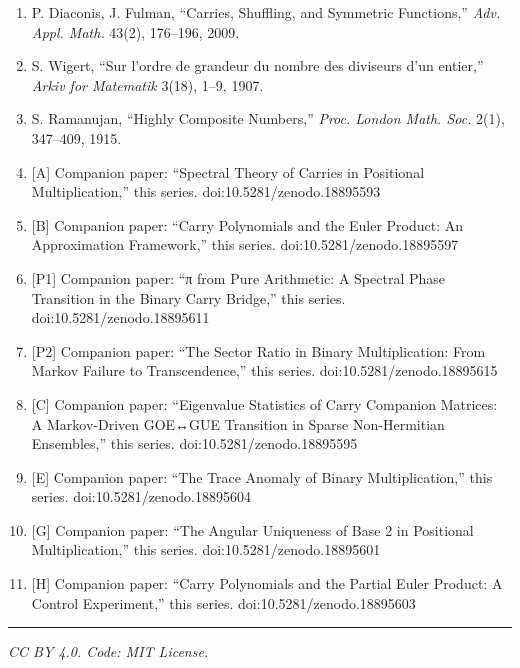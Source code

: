 \documentclass[
  11pt,
]{article}
\providecommand{\tightlist}{%
  \setlength{\itemsep}{0pt}\setlength{\parskip}{0pt}}
\begin{document}
\begin{enumerate}
\def\labelenumi{\arabic{enumi}.}
\tightlist
\item
  P. Diaconis, J. Fulman, ``Carries, Shuffling, and Symmetric Functions,''
  \emph{Adv. Appl. Math.} 43(2), 176--196, 2009.
\item
  S. Wigert, ``Sur l'ordre de grandeur du nombre des diviseurs d'un entier,''
  \emph{Arkiv for Matematik} 3(18), 1--9, 1907.
\item
  S. Ramanujan, ``Highly Composite Numbers,'' \emph{Proc. London Math. Soc.}
  2(1), 347--409, 1915.
\item
  {[}A{]} Companion paper: ``Spectral Theory of Carries in Positional
  Multiplication,'' this series. doi:10.5281/zenodo.18895593
\item
  {[}B{]} Companion paper: ``Carry Polynomials and the Euler Product: An
  Approximation Framework,'' this series. doi:10.5281/zenodo.18895597
\item
  {[}P1{]} Companion paper: ``π from Pure Arithmetic: A Spectral Phase
  Transition in the Binary Carry Bridge,'' this series.
  doi:10.5281/zenodo.18895611
\item
  {[}P2{]} Companion paper: ``The Sector Ratio in Binary Multiplication: From
  Markov Failure to Transcendence,'' this series. doi:10.5281/zenodo.18895615
\item
  {[}C{]} Companion paper: ``Eigenvalue Statistics of Carry Companion Matrices:
  A Markov-Driven GOE↔GUE Transition in Sparse Non-Hermitian Ensembles,'' this
  series. doi:10.5281/zenodo.18895595
\item
  {[}E{]} Companion paper: ``The Trace Anomaly of Binary Multiplication,'' this
  series. doi:10.5281/zenodo.18895604
\item
  {[}G{]} Companion paper: ``The Angular Uniqueness of Base 2 in Positional
  Multiplication,'' this series. doi:10.5281/zenodo.18895601
\item
  {[}H{]} Companion paper: ``Carry Polynomials and the Partial Euler Product: A
  Control Experiment,'' this series. doi:10.5281/zenodo.18895603
\end{enumerate}

\begin{center}\rule{0.5\linewidth}{0.5pt}\end{center}

\emph{CC BY 4.0. Code: MIT License.}
\end{document}
